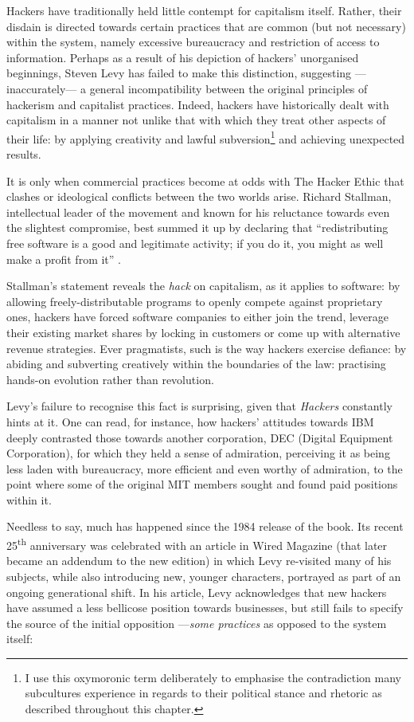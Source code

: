 Hackers have traditionally held little contempt for capitalism itself. Rather, their disdain is directed towards certain practices that are common (but not necessary) within the system, namely excessive bureaucracy and restriction of access to information. Perhaps as a result of his depiction of hackers' unorganised beginnings, Steven Levy has failed to make this distinction, suggesting ---inaccurately--- a general incompatibility between the original principles of hackerism and capitalist practices. Indeed, hackers have historically dealt with capitalism in a manner not unlike that with which they treat other aspects of their life: by applying creativity and lawful subversion\footnote{I use this oxymoronic term deliberately to emphasise the contradiction many subcultures experience in regards to their political stance and rhetoric as described throughout this chapter.} and achieving unexpected results.

It is only when commercial practices become at odds with The Hacker Ethic that clashes or ideological conflicts between the two worlds arise. Richard Stallman, intellectual leader of the movement and known for his reluctance towards even the slightest compromise, best summed it up by declaring that ``redistributing free software is a good and legitimate activity; if you do it, you might as well make a profit from it'' \citep[p. 65]{stallman02}.

Stallman's statement reveals the \textit{hack} on capitalism, as it applies to software: by allowing freely-distributable programs to openly compete against proprietary ones, hackers have forced software companies to either join the trend, leverage their existing market shares by locking in customers \citep{lee08} or come up with alternative revenue strategies. Ever pragmatists, such is the way hackers exercise defiance: by abiding and subverting creatively within the boundaries of the law: practising hands-on evolution rather than revolution.

Levy's failure to recognise this fact is surprising, given that \textit{Hackers} constantly hints at it. One can read, for instance, how hackers' attitudes towards IBM deeply contrasted those towards another corporation, DEC (Digital Equipment Corporation), for which they held a sense of admiration, perceiving it as being less laden with bureaucracy, more efficient and even worthy of admiration, to the point where some of the original MIT members sought and found paid positions within it.

Needless to say, much has happened since the 1984 release of the book. Its recent 25\textsuperscript{th} anniversary was celebrated with an article in Wired Magazine (that later became an addendum to the new edition) in which Levy re-visited many of his subjects, while also introducing new, younger characters, portrayed as part of an ongoing generational shift. In his article, Levy acknowledges that new hackers have assumed a less bellicose position towards businesses, but still fails to specify the source of the initial opposition ---\emph{some practices} as opposed to the system itself:

